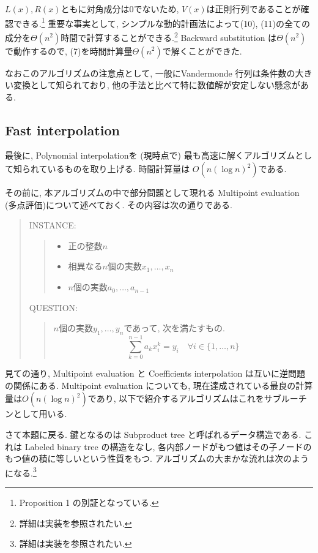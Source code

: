 \documentclass[uplatex,dvipdfmx,titlepage]{jsarticle}
\begin{document}
  $L(x), R(x)$ともに対角成分は$0$でないため, $V(x)$は正則行列であることが確認できる.\footnote{Proposition 1 の別証となっている.}
  重要な事実として, シンプルな動的計画法によって(10), (11)の全ての成分を$\Theta(n^2)$時間で計算することができる.\footnote{詳細は実装を参照されたい.}
  Backward substitution は$\Theta(n^2)$で動作するので, (7)を時間計算量$\Theta(n^2)$で解くことができた.

  なおこのアルゴリズムの注意点として, 一般にVandermonde 行列は条件数の大きい変換として知られており\cite{1}, 他の手法と比べて特に数値解が安定しない懸念がある.

  \subsection{Fast interpolation}
  最後に, Polynomial interpolationを (現時点で) 最も高速に解くアルゴリズム\cite{2}として知られているものを取り上げる.
  時間計算量は $O(n (\log n)^2)$である.

  その前に, 本アルゴリズムの中で部分問題として現れる Multipoint evaluation (多点評価)について述べておく. その内容は次の通りである.
  \newpage
  \begin{quote}
    INSTANCE:
    \begin{quote}
      \begin{itemize}
        \item 正の整数$n$
        \item 相異なる$n$個の実数$x_1, \ldots , x_n$
        \item $n$個の実数$a_0, \ldots , a_{n-1}$\\
      \end{itemize}
    \end{quote}

    QUESTION:
    \begin{quote}
      $n$個の実数$y_1, \ldots, y_n$であって, 次を満たすもの.
      \begin{equation*}
        \sum_{k=0}^{n-1} a_k x_i^k = y_i \quad \forall i \in \{1, \ldots, n\}
      \end{equation*}
    \end{quote}
  \end{quote}
  見ての通り, Multipoint evaluation と Coefficients interpolation は互いに逆問題の関係にある.
  Multipoint evaluation についても, 現在達成されている最良の計算量は$O(n(\log n)^2)$であり,
  以下で紹介するアルゴリズムはこれをサブルーチンとして用いる.

  さて本題に戻る. 鍵となるのは Subproduct tree と呼ばれるデータ構造である.
  これは Labeled binary tree の構造をなし, 各内部ノードがもつ値はその子ノードのもつ値の積に等しいという性質をもつ.
  アルゴリズムの大まかな流れは次のようになる.\footnote{詳細は実装を参照されたい.}
\end{document}
